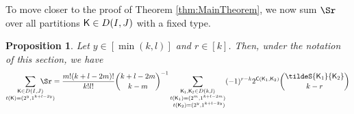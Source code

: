 \documentclass[11pt, a4paper, oneside, reqno]{amsart}
\newcommand{\sK}{{\sf K}}
\newcommand{\setK}{{D(I,J)}}
\newcommand{\partitionskl}{{D(k,l)}}
\newtheorem{proposition}[theorem]{Proposition}
\theoremstyle{remark}
\theoremstyle{definition}
\numberwithin{equation}{section}
\begin{document}
To move closer to the proof of Theorem \ref{thm:MainTheorem}, we now sum $\Sr$ over all partitions $\sK \in \setK$ with a fixed type. 
\begin{proposition}
	\label{prop:symmetrization}
	Let $y \in [\min(k,l)]$ and $r \in [k]$. Then, under the notation of this section, we have
	\begin{align*}
		\sum_{\substack{{\sK}\in \setK \\ t({\sK})=(2^y,1^{k+l-2y})}} \hspace{-0.75cm}\Sr= \frac{m!(k+l-2m)!}{k!l!}\binom{k+l-2m}{k-m}^{-1}\sum_{\substack{{\sf K_1, \sf K_2} \in \partitionskl\\ {t({\sK}_1)}=(2^m,1^{k+l-2m}) \\  {t({\sK}_2)}=(2^y,1^{k+l-2y})}} (-1)^{r-k}2^{{\sf C}({\sK_1},{\sK_2})} \binom{\tildeS{\sK_1}{\sK_2}}{k-r}
	\end{align*}
\end{proposition}
\end{document}
